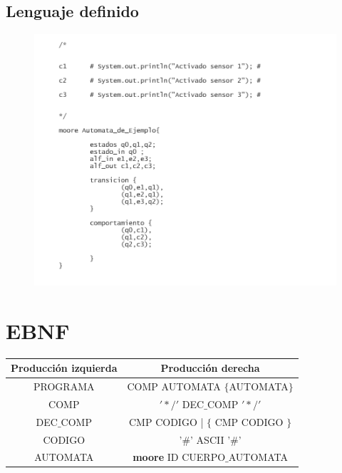 \documentclass[12pt,a4paper]{article}
\begin{document}
{	\subsection{Lenguaje definido}
	\begin{center}
\begin{figure}[h]
	\centering
	\includegraphics[width=0.8\linewidth]{img/aut}
	\caption{}
	\label{fig:aut}
\end{figure}

	\end{center}
	
	

	\newpage
	\section{EBNF}
			\begin{center}
			\begin{tabular}{|c|c|}
				\hline 
		\textbf{Producción izquierda} & \textbf{Producción derecha} \\ 
				\hline 
				PROGRAMA & COMP AUTOMATA $\{$AUTOMATA$\}$ \\ 
				\hline 
				COMP  & $'\ast/'$ DEC$\_$COMP $'\ast/'$ \\ 
				\hline 
				DEC$\_$COMP & CMP  CODIGO | $\{$ CMP CODIGO $\}$ \\ 
				\hline 
				CODIGO 	&'$\#$' ASCII '$\#$' \\ 
				\hline 
				AUTOMATA &  \textbf{moore} ID CUERPO$\_$AUTOMATA \\
				\hline 
			

\end{tabular}
\end{center}}
\end{document}
